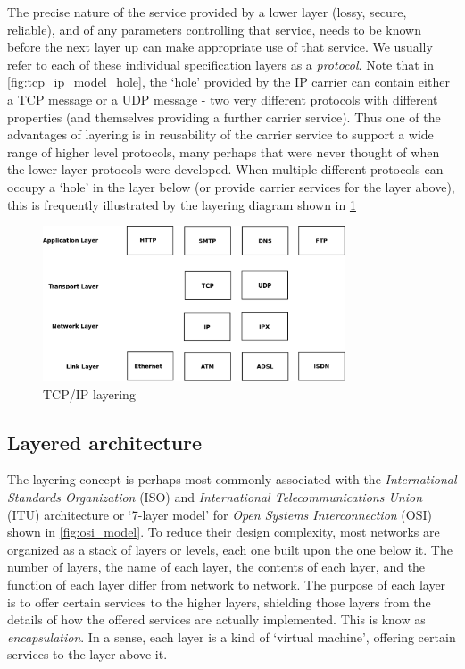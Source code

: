 \documentclass[times, utf8, diplomski]{fer}
\begin{document}
The precise nature of the service provided by a lower layer (lossy, secure, reliable), and of any parameters controlling that service, needs to be known before the next layer up can make appropriate use of that service. We usually refer to each of these individual specification layers as a \emph{protocol}.
Note that in \ref{fig:tcp_ip_model_hole}, the `hole' provided by the IP carrier can contain either a TCP message or a UDP message - two very different protocols with different properties (and themselves providing a further carrier service). Thus one of the advantages of layering is in reusability of the carrier service to support a wide range of higher level protocols, many perhaps that were never thought of when the lower layer protocols were developed. 
When multiple different protocols can occupy a `hole' in the layer below (or provide carrier services for the layer above), this is frequently illustrated by the layering diagram shown in \ref{fig:tcp_ip_layering}
\begin{figure}[htb]
\begin{center}
\leavevmode
\includegraphics[width=0.8\textwidth]{tcp_ip_layering}
\end{center}
\caption{TCP/IP layering}
\label{fig:tcp_ip_layering}
\end{figure}

\subsection{Layered architecture}
The layering concept is perhaps most commonly associated with the 
\emph{International Standards Organization} (ISO) and \emph{International 
Telecommunications Union} (ITU) architecture or `7-layer model' for \emph{Open 
Systems Interconnection} (OSI) shown in \ref{fig:osi_model}. To reduce their 
design complexity, most networks are organized as a stack of layers or levels, 
each one built upon the one below it. The number of layers, the name of each layer, 
the contents of each layer, and the function of each layer differ from network to network. 
The purpose of each layer is to offer certain services to the higher layers, 
shielding those layers from the details of how the offered services are actually 
implemented. This is know as \emph{encapsulation}. In a sense, each layer is a 
kind of `virtual machine', offering certain services to the layer above it.
\end{document}
